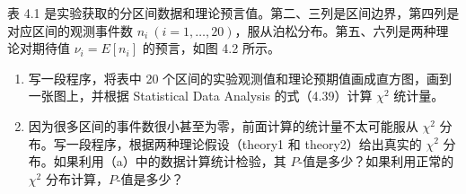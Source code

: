 \begin{question}
表 4.1
是实验获取的分区间数据和理论预言值。第二、三列是区间边界，第四列是对应区间的观测事件数
\(n_i\ (i=1,\ldots,20)\)，服从泊松分布。第五、六列是两种理论对期待值
\(\nu_i=E[n_i]\) 的预言，如图 4.2 所示。

\begin{enumerate}
\item 写一段程序，将表中 20
个区间的实验观测值和理论预期值画成直方图，画到一张图上，并根据
Statistical Data Analysis 的式（4.39）计算 \(\chi^2\) 统计量。

\item 因为很多区间的事件数很小甚至为零，前面计算的统计量不太可能服从
\(\chi^2\) 分布。写一段程序，根据两种理论假设（theory1 和
theory2）给出真实的 \(\chi^2\)
分布。如果利用（a）中的数据计算统计检验，其
\(P\)-值是多少？如果利用正常的 \(\chi^2\) 分布计算，\(P\)-值是多少？


\end{enumerate}
\end{question}
